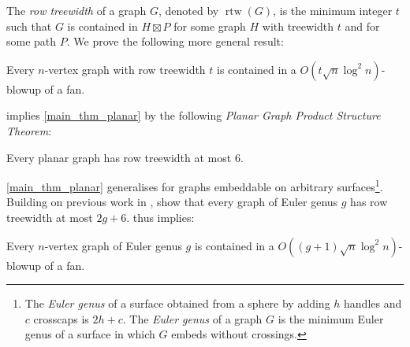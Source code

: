 \documentclass{patmorin}
\newcommand{\david}[1]{{\color{orange} David: #1}}
\newcommand{\defin}[1]{\emph{\textcolor{brightmaroon}{#1}}}
\DeclareMathOperator{\rtw}{rtw}
\begin{document}
The \defin{row treewidth} of a graph $G$, denoted by $\rtw(G)$, is the minimum integer $t$ such that $G$ is contained in $H\boxtimes P$ for some graph $H$ with treewidth $t$ and for some path $P$. We prove the following more general result:


\begin{thm}\label{main_thm_products}
  Every $n$-vertex graph with row treewidth $t$ is contained in a $O(t\sqrt{n}\log^2 n)$-blowup of a fan.
\end{thm}

 implies \cref{main_thm_planar} by the following \defin{Planar Graph Product Structure Theorem}:

\begin{thm}\label{planar_product_structure}
  Every planar graph has row treewidth at most $6$.
\end{thm}


\cref{main_thm_planar} generalises for graphs embeddable on arbitrary surfaces\footnote{The \defin{Euler genus} of a surface obtained from a sphere by adding $h$ handles and $c$ crosscaps is $2h+c$. The \defin{Euler genus} of a graph $G$ is the minimum Euler genus of a surface in which $G$ embeds without crossings.}.
Building on previous work in \citep{dujmovic.joret.ea:planar,ueckerdt.wood.ea:improved}, \citet{distel.hickingbotham.ea:improved} show that every graph of Euler genus $g$ has row treewidth at most $2g+6$.  thus implies:

\begin{thm}\label{genus_products}
Every $n$-vertex graph of Euler genus $g$ is contained in a $O((g+1)\sqrt{n}\log^2 n)$-blowup of a fan.
\end{thm}
\end{document}

